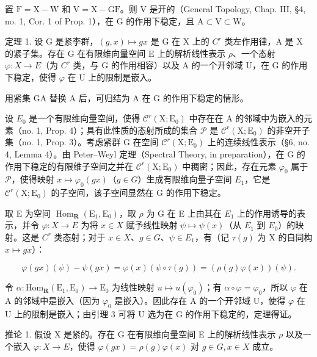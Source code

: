 置 \(\mathrm{F} = \mathrm{X} - \mathrm{W}\) 和 \(\mathrm{V} = \mathrm{X} - \mathrm{GF}\)。则 \(\mathrm{V}\) 是开的（General Topology, Chap. III, §4, no. 1, Cor. 1 of Prop. 1），在 \(\mathrm{G}\) 的作用下稳定，且 \(\mathrm{A} \subset \mathrm{V} \subset \mathrm{W}\)。

定理 1. 设 G 是紧李群，\((g,x)\mapsto gx\) 是 G 在 X 上的 \(C^{r}\) 类左作用律，A 是 X 的紧子集。存在 G 在有限维向量空间 E 上的解析线性表示 \(\rho\)、一个态射 \(\varphi:X\to E\)（为 \(C^{r}\) 类，与 G 的作用相容）以及 A 的一个开邻域 U，在 G 的作用下稳定，使得 \(\varphi\) 在 U 上的限制是嵌入。

用紧集 GA 替换 A 后，可归结为 A 在 G 的作用下稳定的情形。

设 \(E_0\) 是一个有限维向量空间，使得 \(\mathcal{C}^r(\mathrm{X};\mathrm{E}_0)\) 中存在在 A 的邻域中为嵌入的元素（no. 1, Prop. 4）；具有此性质的态射所成的集合 \(\mathcal{P}\) 是 \(\mathcal{C}^r(\mathrm{X};\mathrm{E}_0)\) 的非空开子集（no. 1, Prop. 3）。考虑紧群 G 在空间 \(\mathcal{C}^r(\mathrm{X};\mathrm{E}_0)\) 上的连续线性表示（§6, no. 4, Lemma 4）。由 Peter–Weyl 定理（Spectral Theory, in preparation），在 G 的作用下稳定的有限维子空间之并在 \(\mathcal{C}^r(\mathrm{X};\mathrm{E}_0)\) 中稠密；因此，存在元素 \(\varphi_0\) 属于 \(\mathcal{P}\)，使得映射 \(x \mapsto \varphi_0(gx)\)（\(g \in G\)）生成有限维向量子空间 \(E_1\)，它是 \(\mathcal{C}^r(\mathrm{X};\mathrm{E}_0)\) 的子空间，该子空间显然在 G 的作用下稳定。

取 E 为空间 \(\operatorname{Hom}_{\mathbf{R}}(\mathrm{E}_{1},\mathrm{E}_{0})\)，取 \(\rho\) 为 G 在 E 上由其在 \(E_{1}\) 上的作用诱导的表示，并令 \(\varphi:X\to E\) 为将 \(x\in X\) 赋予线性映射 \(\psi\mapsto\psi(x)\)（从 \(E_{1}\) 到 \(E_{0}\)）的映射。这是 \(C^{r}\) 类态射；对于 \(x\in X\)、\(g\in G\)、\(\psi\in E_{1}\)，有（记 \(\tau(g)\) 为 X 的自同构 \(x\mapsto gx\)）：

\[
\varphi (g x) (\psi) - \psi (g x) = \varphi (x) (\psi \circ \tau (g)) = (\rho (g) \varphi (x)) (\psi).
\]

令 \(\alpha : \mathrm{Hom}_{\mathbf{R}}(\mathrm{E}_1, \mathrm{E}_0) \to \mathrm{E}_0\) 为线性映射 \(u \mapsto u(\varphi_0)\)；有 \(\alpha \circ \varphi = \varphi_0\)，所以 \(\varphi\) 在 A 的邻域中是嵌入（因为 \(\varphi_0\) 是嵌入）。因此存在 A 的一个开邻域 U，使得 \(\varphi\) 在 U 上的限制是嵌入；由引理 3 可将 U 选为在 G 的作用下稳定的，定理得证。

推论 1. 假设 X 是紧的。存在 G 在有限维向量空间 E 上的解析线性表示 \(\rho\) 以及一个嵌入 \(\varphi: X \to E\)，使得 \(\varphi(gx) = \rho(g)\varphi(x)\) 对 \(g \in G, x \in X\) 成立。

